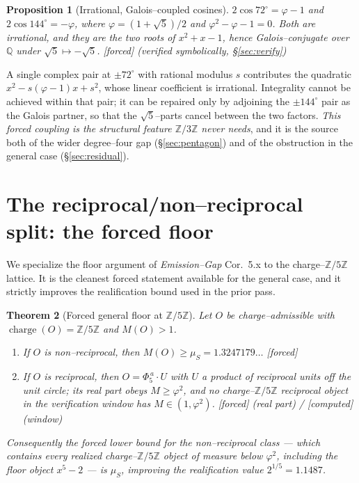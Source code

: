 \documentclass[11pt]{article}
\newcommand{\forced}{\textcolor{cforced}{\textsf{[forced]}}}
\newcommand{\computed}{\textcolor{ccomp}{\textsf{[computed]}}}
\newcommand{\Z}{\mathbb{Z}}
\newcommand{\Q}{\mathbb{Q}}
\newcommand{\Mah}{M}
\newcommand{\muS}{\mu_S}
\newcommand{\Zfive}{\Z/5\Z}
\DeclareMathOperator{\charge}{charge}
\theoremstyle{plain}
\newtheorem{theorem}{Theorem}[section]
\newtheorem{proposition}[theorem]{Proposition}
\theoremstyle{definition}
\theoremstyle{remark}
\begin{document}
\begin{proposition}[Irrational, Galois--coupled cosines]\label{prop:cos}
$2\cos72^\circ=\varphi-1$ and $2\cos144^\circ=-\varphi$, where $\varphi=(1+\sqrt5)/2$ and
$\varphi^2-\varphi-1=0$. Both are irrational, and they are the two roots of $x^2+x-1$, hence
Galois--conjugate over $\Q$ under $\sqrt5\mapsto-\sqrt5$. \forced{} \emph{(verified symbolically,
\S\ref{sec:verify})}
\end{proposition}

A single complex pair at $\pm72^\circ$ with rational modulus $s$ contributes the quadratic
$x^2-s(\varphi-1)x+s^2$, whose linear coefficient is irrational. Integrality cannot be achieved
within that pair; it can be repaired only by adjoining the $\pm144^\circ$ pair as the Galois partner,
so that the $\sqrt5$--parts cancel between the two factors. \emph{This forced coupling is the
structural feature $\Z/3\Z$ never needs}, and it is the source both of the wider degree--four gap
(\S\ref{sec:pentagon}) and of the obstruction in the general case (\S\ref{sec:residual}).

\section{The reciprocal/non--reciprocal split: the forced floor}\label{sec:split}

We specialize the floor argument of \emph{Emission--Gap} Cor.~5.x to the charge--$\Zfive$ lattice.
It is the cleanest forced statement available for the general case, and it strictly improves the
realification bound used in the prior pass.

\begin{theorem}[Forced general floor at $\Zfive$]\label{thm:floor}
Let $O$ be charge--admissible with $\charge(O)=\Zfive$ and $\Mah(O)>1$.
\begin{enumerate}[label=\textup{(\alph*)},leftmargin=2.2em,topsep=2pt]
\item If $O$ is non--reciprocal, then $\Mah(O)\ge\muS=1.3247179\ldots$ \forced{}
\item If $O$ is reciprocal, then $O=\Phi_5^{\,a}\cdot U$ with $U$ a product of reciprocal units off
the unit circle; its real part obeys $\Mah\ge\varphi^2$, and no charge--$\Zfive$ reciprocal object in
the verification window has $\Mah\in(1,\varphi^2)$. \forced{} (real part) / \computed{} (window)
\end{enumerate}
Consequently the forced lower bound for the non--reciprocal class --- which contains every realized
charge--$\Zfive$ object of measure below $\varphi^2$, including the floor object $x^5-2$ --- is
$\muS$, improving the realification value $2^{1/5}=1.1487$.
\end{theorem}
\end{document}

